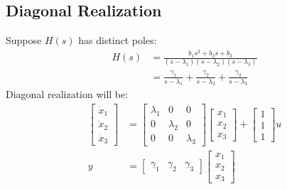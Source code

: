 \documentclass[10pt,a4paper,oneside]{article}
\begin{document}
\subsection{Diagonal Realization}
Suppose $H(s)$ has distinct poles:
\[
\begin{aligned} H(s) &=\frac{b_{1} s^{2}+b_{2} s+b_{3}}{\left(s-\lambda_{1}\right)\left(s-\lambda_{2}\right)\left(s-\lambda_{3}\right)} \\ &=\frac{\gamma_{1}}{s-\lambda_{1}}+\frac{\gamma_{2}}{s-\lambda_{2}}+\frac{\gamma_{3}}{s-\lambda_{3}} \end{aligned}
\]
Diagonal realization will be:
\begin{align*}
	\left[\begin{array}{c}{\dot{x}_{1}} \\ {\dot{x}_{2}} \\ {\dot{x}_{3}}\end{array}\right] &= \left[\begin{array}{ccc}{\lambda_{1}} & {0} & {0} \\ {0} & {\lambda_{2}} & {0} \\ {0} & {0} & {\lambda_{3}}\end{array}\right]\left[\begin{array}{c}{x_{1}} \\ {x_{2}} \\ {x_{3}}\end{array}\right]+\left[\begin{array}{c}{1} \\ {1} \\ {1}\end{array}\right] u\\
	y &= \left[\begin{array}{lll}{\gamma_{1}} & {\gamma_{2}} & {\gamma_{3}}\end{array}\right]\left[\begin{array}{l}{x_{1}} \\ {x_{2}} \\ {x_{3}}\end{array}\right]
\end{align*}
\end{document}

